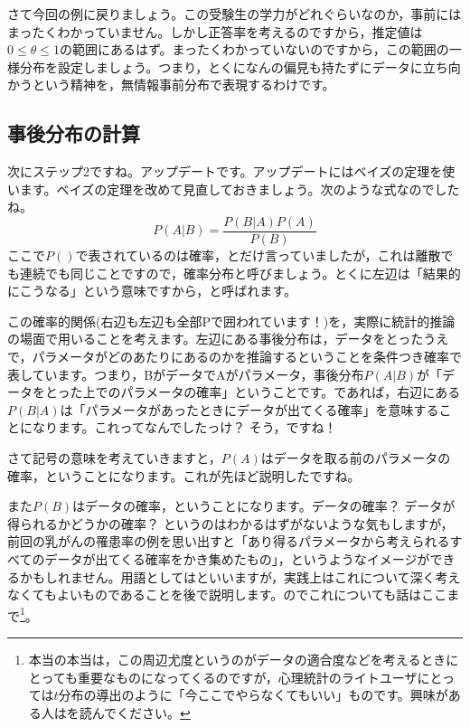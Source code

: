 \documentclass{ltjbook}
\begin{document}
さて今回の例に戻りましょう。この受験生の学力がどれぐらいなのか，事前にはまったくわかっていません。しかし正答率を考えるのですから，推定値は$0 \le \theta \le 1$の範囲にあるはず。まったくわかっていないのですから，この範囲の一様分布を設定しましょう。つまり，とくになんの偏見も持たずにデータに立ち向かうという精神を，無情報事前分布で表現するわけです。

\subsection{事後分布の計算}
次にステップ2ですね。アップデートです。アップデートにはベイズの定理を使います。ベイズの定理を改めて見直しておきましょう。次のような式なのでしたね。
\[ P(A|B) = \frac{P(B|A)P(A)}{P(B)}\]
ここで$P()$で表されているのは確率，とだけ言っていましたが，これは離散でも連続でも同じことですので，確率分布と呼びましょう。とくに左辺は「結果的にこうなる」という意味ですから，と呼ばれます。

この確率的関係(右辺も左辺も全部Pで囲われています！)を，実際に統計的推論の場面で用いることを考えます。左辺にある事後分布は，データをとったうえで，パラメータがどのあたりにあるのかを推論するということを条件つき確率で表しています。つまり，BがデータでAがパラメータ，事後分布$P(A|B)$が「データをとった上でのパラメータの確率」ということです。であれば，右辺にある$P(B|A)$は「パラメータがあったときにデータが出てくる確率」を意味することになります。これってなんでしたっけ？ そう，ですね！

さて記号の意味を考えていきますと，$P(A)$はデータを取る前のパラメータの確率，ということになります。これが先ほど説明したですね。

また$P(B)$はデータの確率，ということになります。データの確率？ データが得られるかどうかの確率？ というのはわかるはずがないような気もしますが，前回の乳がんの罹患率の例を思い出すと「あり得るパラメータから考えられるすべてのデータが出てくる確率をかき集めたもの」，というようなイメージができるかもしれません。用語としてはといいますが，実践上はこれについて深く考えなくてもよいものであることを後で説明します。のでこれについても話はここまで\footnote{本当の本当は，この周辺尤度というのがデータの適合度などを考えるときにとっても重要なものになってくるのですが，心理統計のライトユーザにとっては$t$分布の導出のように「今ここでやらなくてもいい」ものです。興味がある人は\textcite{Hamada201912}を読んでください。}。
\end{document}
